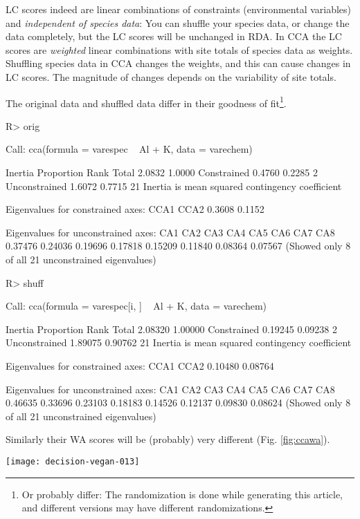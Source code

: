 \documentclass[article,nojss]{jss}
\begin{document}
LC scores indeed are linear combinations of constraints (environmental
variables) and \emph{independent of species data}: You can
shuffle your species data, or change the data completely, but the LC
scores will be unchanged in RDA.  In CCA the LC scores are
\emph{weighted} linear combinations with site totals of species data
as weights. Shuffling species data in CCA changes the weights, and
this can cause changes in LC scores.  The magnitude of changes depends
on the variability of site totals.

The original data and shuffled data differ in their goodness of
fit\footnote{Or probably differ: The randomization is done while
generating this article, and different versions may have different
randomizations.}.
\begin{Schunk}
\begin{Sinput}
R> orig
\end{Sinput}
\begin{Soutput}
Call: cca(formula = varespec ~ Al + K, data = varechem)

              Inertia Proportion Rank
Total          2.0832     1.0000     
Constrained    0.4760     0.2285    2
Unconstrained  1.6072     0.7715   21
Inertia is mean squared contingency coefficient 

Eigenvalues for constrained axes:
  CCA1   CCA2 
0.3608 0.1152 

Eigenvalues for unconstrained axes:
    CA1     CA2     CA3     CA4     CA5     CA6     CA7     CA8 
0.37476 0.24036 0.19696 0.17818 0.15209 0.11840 0.08364 0.07567 
(Showed only 8 of all 21 unconstrained eigenvalues)
\end{Soutput}
\begin{Sinput}
R> shuff
\end{Sinput}
\begin{Soutput}
Call: cca(formula = varespec[i, ] ~ Al + K, data = varechem)

              Inertia Proportion Rank
Total         2.08320    1.00000     
Constrained   0.19245    0.09238    2
Unconstrained 1.89075    0.90762   21
Inertia is mean squared contingency coefficient 

Eigenvalues for constrained axes:
   CCA1    CCA2 
0.10480 0.08764 

Eigenvalues for unconstrained axes:
    CA1     CA2     CA3     CA4     CA5     CA6     CA7     CA8 
0.46635 0.33696 0.23103 0.18183 0.14526 0.12137 0.09830 0.08624 
(Showed only 8 of all 21 unconstrained eigenvalues)
\end{Soutput}
\end{Schunk}
Similarly their WA scores will be (probably) very different
(Fig. \ref{fig:ccawa}).
\begin{SCfigure}
\texttt{[image: decision-vegan-013]}
\caption{Procrustes rotation of WA scores of CCA with the original and
  shuffled data.}
\label{fig:ccawa}
\end{SCfigure}
\end{document}
